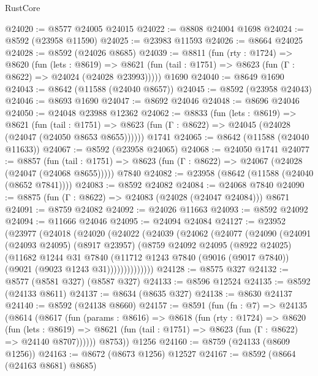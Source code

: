 \begin{lexlean}{RustCore}
\begin{coremodule}
@24020 := @8577 @24005 @24015
@24022 := @8808 @24004 @1698
@24024 := @8592 (@23958 @11590)
@24025 := @23983 @11593
@24026 := @8664 @24025
@24028 := @8592 (@24026 @8685)
@24039 := @8811
    (fun (rty : @1724) =>
    @8620
      (fun (lets : @8619) =>
      @8621 (fun (tail : @1751) => @8623 (fun (Γ : @8622) => @24024 (@24028 @23993)))))
    @1690
@24040 := @8649 @1690
@24043 := @8642 (@11588 (@24040 @8657))
@24045 := @8592 (@23958 @24043)
@24046 := @8693 @1690
@24047 := @8692 @24046
@24048 := @8696 @24046
@24050 := @24048 @23988 @12362
@24062 := @8833
    (fun (lets : @8619) =>
    @8621
      (fun (tail : @1751) =>
      @8623 (fun (Γ : @8622) => @24045 (@24028 (@24047 (@24050 @8653 @8655))))))
    @1741
@24065 := @8642 (@11588 (@24040 @11633))
@24067 := @8592 (@23958 @24065)
@24068 := @24050 @1741
@24077 := @8857
    (fun (tail : @1751) => @8623 (fun (Γ : @8622) => @24067 (@24028 (@24047 (@24068 @8655)))))
    @7840
@24082 := @23958 (@8642 (@11588 (@24040 (@8652 @7841))))
@24083 := @8592 @24082
@24084 := @24068 @7840
@24090 := @8875 (fun (Γ : @8622) => @24083 (@24028 (@24047 @24084))) @8671
@24091 := @8759 @24082
@24092 := @24026 @11663
@24093 := @8592 @24092
@24094 := @11666 @24046
@24095 := @24094 @24084
@24127 := @23952
    (@23977
      (@24018
        (@24020
          (@24022
            (@24039
              (@24062
                (@24077
                  (@24090
                    (@24091
                      (@24093 @24095)
                      (@8917 @23957)
                      (@8759
                        @24092
                        @24095
                        (@8922 @24025)
                        (@11682
                          @1244
                          @31
                          @7840
                          (@11712
                            @1243
                            @7840
                            (@9016 (@9017 @7840))
                            (@9021 (@9023 @1243 @31))))))))))))))
@24128 := @8575 @327
@24132 := @8577 (@8581 @327) (@8587 @327)
@24133 := @8596 @12524
@24135 := @8592 (@24133 @8611)
@24137 := @8634 (@8635 @327)
@24138 := @8630 @24137
@24140 := @8592 (@24138 @8660)
@24157 := @8591
    (fun (fn : @7) =>
    @24135
      (@8614
        (@8617
          (fun (params : @8616) =>
          @8618
            (fun (rty : @1724) =>
            @8620
              (fun (lets : @8619) =>
              @8621 (fun (tail : @1751) => @8623 (fun (Γ : @8622) => @24140 @8707))))))
        @8753))
    @1256
@24160 := @8759 (@24133 (@8609 @1256))
@24163 := @8672 (@8673 @1256) @12527
@24167 := @8592 (@8664 (@24163 @8681) @8685)

\end{coremodule}
\end{lexlean}
